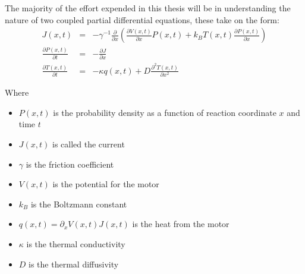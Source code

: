 
The majority of the effort expended in this thesis will be in understanding the nature of two coupled partial differential equations, these take on the form:
\begin{eqnarray}
J(x, t) &=& -\gamma^{-1} \frac{\partial}{\partial x} \left ( \frac{\partial V(x, t)}{\partial x} P(x, t) + k_B T(x, t) \frac{\partial P(x, t)}{\partial x} \right )  \\
\frac{\partial P(x, t)}{\partial t} &=& -\frac{\partial J}{\partial x} \label{eqn:Smoluchowski} \\
\frac{\partial T(x, t)}{\partial t} &=& -\kappa q(x, t) + D \frac{\partial^2 T(x, t)}{\partial x^2} \label{eqn:TemperatureEvolution}
\end{eqnarray}

Where
\begin{itemize}
\item{$P(x, t)$ is the probability density as a function of  reaction coordinate $x$ and time $t$}
\item{$J(x, t)$ is called the current}
\item{$\gamma$ is the friction coefficient}
\item{$V(x, t)$ is the potential for the motor}
\item{$k_B$ is the Boltzmann constant}
\item{$q(x, t) = \partial_x V(x, t) J(x, t)$ is the heat from the motor}
\item{$\kappa$ is the thermal conductivity}
\item{$D$ is the thermal diffusivity}
\end{itemize}

